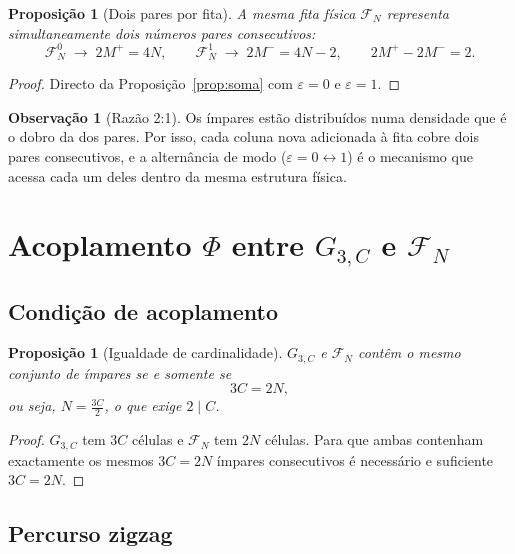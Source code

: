 \documentclass[12pt, a4paper]{article}
\theoremstyle{plain}
\newtheorem{proposition}[theorem]{Proposição}
\theoremstyle{definition}
\newtheorem{remark}[theorem]{Observação}
\theoremstyle{remark}
\begin{document}
	\begin{proposition}[Dois pares por fita]
		\label{prop:dois}
		A mesma fita física $\mathcal{F}_N$ representa simultaneamente
		dois números pares consecutivos:
		\[
		\mathcal{F}_N^0 \;\longrightarrow\; 2M^+ = 4N,
		\qquad
		\mathcal{F}_N^1 \;\longrightarrow\; 2M^- = 4N-2,
		\qquad
		2M^+ - 2M^- = 2.
		\]
	\end{proposition}
	
	\begin{proof}
		Directo da Proposição~\ref{prop:soma} com $\varepsilon=0$ e
		$\varepsilon=1$.
	\end{proof}
	
	\begin{remark}[Razão 2:1]
		Os ímpares estão distribuídos numa densidade que é o dobro da dos
		pares.  Por isso, cada coluna nova adicionada à fita cobre dois
		pares consecutivos, e a alternância de modo
		($\varepsilon=0\leftrightarrow1$) é o mecanismo que acessa cada
		um deles dentro da mesma estrutura física.
	\end{remark}
	
	\section{Acoplamento $\Phi$ entre $G_{3,C}$ e $\mathcal{F}_N$}
	\label{sec:phi}
	
	\subsection{Condição de acoplamento}
	
	\begin{proposition}[Igualdade de cardinalidade]
		\label{prop:card}
		$G_{3,C}$ e $\mathcal{F}_N$ contêm o mesmo conjunto de ímpares
		se e somente se
		\[
		3C = 2N,
		\]
		ou seja, $N=\frac{3C}{2}$, o que exige $2\mid C$.
	\end{proposition}
	
	\begin{proof}
		$G_{3,C}$ tem $3C$ células e $\mathcal{F}_N$ tem $2N$ células.
		Para que ambas contenham exactamente os mesmos $3C=2N$ ímpares
		consecutivos é necessário e suficiente $3C=2N$.
	\end{proof}
	
	\subsection{Percurso zigzag}
	
\end{document}
